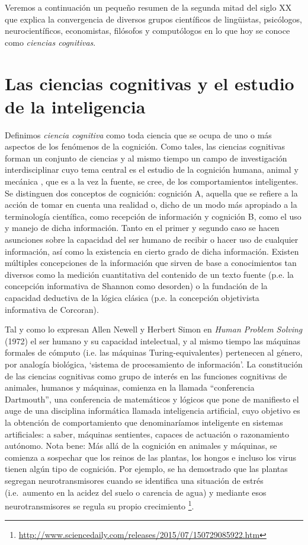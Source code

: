\documentclass[12pt]{memoir}
\begin{document}
Veremos a continuación un pequeño resumen de la segunda mitad del siglo XX que explica la convergencia de diversos grupos científicos de lingüistas, psicólogos, neurocientíficos, economistas, filósofos y computólogos en lo que hoy se conoce como \textit{ciencias cognitivas}.

\section{Las ciencias cognitivas y el estudio de la inteligencia}

Definimos \textit{ciencia cognitiva} como toda ciencia que se ocupa de uno o más aspectos de los fenómenos de la cognición. Como tales, las ciencias cognitivas forman un conjunto de ciencias y al mismo tiempo un campo de investigación interdisciplinar cuyo tema central es el estudio de la cognición humana, animal y mecánica \parencite[p.20]{pmf07}, que es a la vez la fuente, se cree, de los comportamientos inteligentes. Se distinguen dos conceptos de cognición: cognición A, aquella que se refiere a la acción de tomar en cuenta una realidad o, dicho de un modo más apropiado a la terminología científica, como recepción de información y cognición B, como el uso y manejo de dicha información. Tanto en el primer y segundo caso se hacen asunciones sobre la capacidad del ser humano de recibir o hacer uso de cualquier información, así como la existencia en cierto grado de dicha información. Existen múltiples concepciones de la información que sirven de base a conocimientos tan diversos como la medición cuantitativa del contenido de un texto fuente (p.e. la concepción informativa de Shannon como desorden) o la fundación de la capacidad deductiva de la
lógica clásica (p.e. la concepción objetivista informativa de Corcoran).

Tal y como lo expresan Allen Newell y Herbert Simon en \textit{Human Problem Solving}
(1972) el ser humano y su capacidad intelectual, y al mismo tiempo las máquinas formales de cómputo (i.e. las máquinas Turing-equivalentes) pertenecen al género, por analogía biológica, `sistema de procesamiento de información'. La constitución de las ciencias cognitivas como grupo de interés en las funciones cognitivas de animales, humanos y máquinas, comienza en la llamada ``conferencia Dartmouth'', una conferencia de matemáticos y lógicos que pone de manifiesto el auge de una disciplina informática llamada inteligencia artificial, cuyo objetivo es la obtención de comportamiento que denominaríamos inteligente en sistemas artificiales: a saber, máquinas sentientes, capaces de actuación o razonamiento autónomo. Nota bene: Más allá de la cognición en animales y máquinas, se comienza a sospechar que los reinos de las plantas, los hongos e incluso los virus tienen algún tipo de cognición. Por ejemplo, se ha demostrado que las plantas segregan neurotransmisores cuando se identifica una situación de estrés (i.e.\ aumento en la acidez del suelo o carencia de agua) y mediante esos neurotransmisores se regula su propio crecimiento \footnote{\url{http://www.sciencedaily.com/releases/2015/07/150729085922.htm} }.
\end{document}
